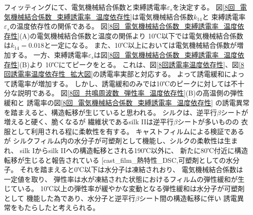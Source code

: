 \documentclass[dvipdfmx,12pt,a4paper]{jreport}
\makeatletter
\DeclareRobustCommand\cite{\unskip
    	\@ifnextchar[{\@tempswatrue\@citex}{\@tempswafalse\@citex[]}}
\makeatother
\begin{document}
			\newpage
			フィッティングにて、電気機械結合係数と束縛誘電率$\varepsilon_s$を決定する。
			図\ref{8回_電気機械結合係数_束縛誘電率_温度依存性}は電気機械結合係数$k_{14}$と
			束縛誘電率$\varepsilon_s$の温度依存性の関係である。
			図\ref{8回_電気機械結合係数_束縛誘電率_温度依存性}(A)の電気機械結合係数と温度の関係より
			10℃以下では電気機械結合係数は$k_{14}=0.018$と一定になる。
			また、10℃以上においては電気機械結合係数が増加する。
			一方、束縛誘電率$\varepsilon_s$は図\ref{8回_電気機械結合係数_束縛誘電率_温度依存性}(B)より
			10℃にてピークをとる。
			これは、図\ref{8回誘電率温度依存性}、図\ref{8回誘電率温度依存性_拡大図}の誘電率実部と対応する。
			よって誘電緩和によって誘電率が増加する。
			しかし、誘電緩和のみでは10℃のピークに対しては不十分な説明である。
			図\ref{8回_共鳴周波数_弾性率_温度依存性}(B)の高温側の弾性緩和と
			誘電率の図\ref{8回_電気機械結合係数_束縛誘電率_温度依存性}
			の誘電異常を踏まえると、構造転移が生じていると思われる。
			シルクは、逆平行$\beta$シートが増えると硬く、脆くなるが
			繊維状であるsilk IIは逆平行$\beta$シートが多いものの
			衣服として利用される程に柔軟性を有する。
			キャストフィルムによる検証であるが
			シルクフィルム内の水分子が可塑剤として機能し、シルクの柔軟性は生まれ、
			silk Iからsilk IIへの構造転移とされる190℃以外に、
			新たに80℃付近に構造転移が生じると報告されている
			\cite{cast_film_熱特性_DSC,可塑剤としての水分子}。
			それを踏まえると0℃以下は水分子は凍結されおり、
			電気機械結合係数は一定値を取り、
			弾性率は水が凍結された状態におけるフィルムの弾性緩和が生じている。
			10℃以上の弾性率が緩やかな変動となる弾性緩和は水分子が可塑剤として
			機能した為であり、水分子と逆平行$\beta$シート間の構造転移に伴い
			誘電異常をもたらしたと考えられる。
\end{document}
